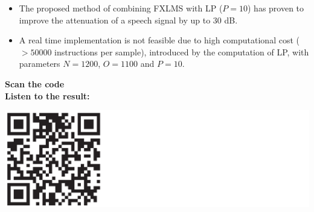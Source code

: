 \large
\begin{itemize}
	\item The proposed method of combining FXLMS with LP ($P=10$) has proven to improve the attenuation of a speech signal by up to 30 dB. \\
	\item A real time implementation is not feasible due to high computational cost ($>50000$ instructions per sample), introduced by the computation of LP, with parameters $N=1200$, $O=1100$ and $P=10$. \\
\end{itemize}
\vspace{-5mm}
 \begin{minipage}{.8\columnwidth}
 	\begin{center}
	 	\textbf {\Large {\textcolor{aaublue1}{Scan the code}}}\\
	 	\textbf{\textcolor{aaublue1}{Listen to the result:}}
 	\end{center}
 \end{minipage}%
 \begin{minipage}{0.2\columnwidth}
 	\includegraphics[width=2.5\textwidth]{figures/QRCODE.pdf}
 \end{minipage}